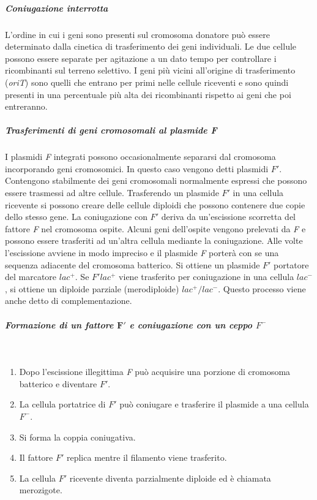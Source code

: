 				\subparagraph{Coniugazione interrotta}
				L'ordine in cui i geni sono presenti sul cromosoma donatore può essere determinato dalla cinetica di trasferimento dei geni individuali. 
				Le due cellule possono essere separate per agitazione a un dato tempo per controllare i ricombinanti sul terreno selettivo.
				I geni più vicini all'origine di trasferimento (\emph{oriT}) sono quelli che entrano per primi nelle cellule riceventi e sono quindi presenti in una percentuale più alta dei ricombinanti rispetto ai geni che poi entreranno. 

				\subparagraph{Trasferimenti di geni cromosomali al plasmide \emph{F}}
				I plasmidi \emph{F} integrati possono occasionalmente separarsi dal cromosoma incorporando geni cromosomici.
				In questo caso vengono detti plasmidi \emph{$F'$}. 
				Contengono stabilmente dei geni cromosomali normalmente espressi che possono essere trasmessi ad altre cellule. 
				Trasferendo un plasmide \emph{$F'$} in una cellula ricevente si possono creare delle cellule diploidi che possono contenere due copie dello stesso gene. 
				La coniugazione con \emph{$F'$} deriva da un'escissione scorretta del fattore \emph{F} nel cromosoma ospite. 
				Alcuni geni dell'ospite vengono prelevati da \emph{F} e possono essere trasferiti ad un'altra cellula mediante la coniugazione. 
				Alle volte l'escissione avviene in modo impreciso e il plasmide \emph{F} porterà con se una sequenza adiacente del cromosoma batterico. 
				Si ottiene un plasmide \emph{$F'$} portatore del marcatore \emph{$lac^{+}$}. 
				Se \emph{$F'lac^{+}$} viene trasferito per coniugazione in una cellula \emph{$lac^{-}$}, si ottiene un diploide parziale (merodiploide) \emph{$lac^{+}/lac^{-}$}.
				Questo processo viene anche detto di complementazione.

				\subparagraph{Formazione di un fattore \emph{$\mathbf{F'}$} e coniugazione con un ceppo \emph{$F^-$}}\mbox{}\\
				\begin{multicols}{2}
					\begin{enumerate}
    						\item Dopo l'escissione illegittima \emph{F} può acquisire una porzione di cromosoma batterico e diventare \emph{$F'$}.
						\item La cellula portatrice di \emph{$F'$} può coniugare e trasferire il plasmide a una cellula \emph{$F^-$}.
						\item Si forma la coppia coniugativa.
    						\item Il fattore \emph{$F'$} replica mentre il filamento viene trasferito.
    						\item La cellula \emph{$F'$} ricevente diventa parzialmente diploide ed è chiamata merozigote. 
					\end{enumerate}
				\end{multicols}
